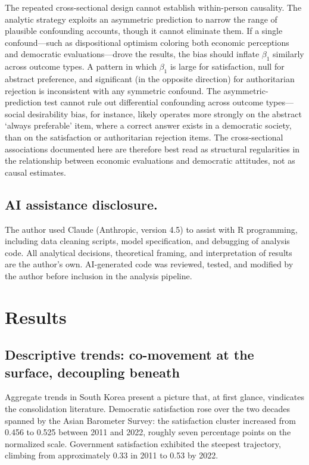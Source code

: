 \documentclass[
  12pt,
  12pt,
  letterpaper]{article}
\begin{document}
The repeated cross-sectional design cannot establish within-person
causality. The analytic strategy exploits an asymmetric prediction to
narrow the range of plausible confounding accounts, though it cannot
eliminate them. If a single confound---such as dispositional optimism
coloring both economic perceptions and democratic evaluations---drove
the results, the bias should inflate \(\beta_1\) similarly across
outcome types. A pattern in which \(\beta_1\) is large for satisfaction,
null for abstract preference, and significant (in the opposite
direction) for authoritarian rejection is inconsistent with any
symmetric confound. The asymmetric-prediction test cannot rule out
differential confounding across outcome types---social desirability
bias, for instance, likely operates more strongly on the abstract
`always preferable' item, where a correct answer exists in a democratic
society, than on the satisfaction or authoritarian rejection items. The
cross-sectional associations documented here are therefore best read as
structural regularities in the relationship between economic evaluations
and democratic attitudes, not as causal estimates.

\subsection{AI assistance disclosure.}\label{ai-assistance-disclosure.}

The author used Claude (Anthropic, version 4.5) to assist with R
programming, including data cleaning scripts, model specification, and
debugging of analysis code. All analytical decisions, theoretical
framing, and interpretation of results are the author's own.
AI-generated code was reviewed, tested, and modified by the author
before inclusion in the analysis pipeline.

\section{Results}\label{results}

\subsection{Descriptive trends: co-movement at the surface, decoupling
beneath}\label{descriptive-trends-co-movement-at-the-surface-decoupling-beneath}

Aggregate trends in South Korea present a picture that, at first glance,
vindicates the consolidation literature. Democratic satisfaction rose
over the two decades spanned by the Asian Barometer Survey: the
satisfaction cluster increased from 0.456 to 0.525 between 2011 and
2022, roughly seven percentage points on the normalized scale.
Government satisfaction exhibited the steepest trajectory, climbing from
approximately 0.33 in 2011 to 0.53 by 2022.
\end{document}
